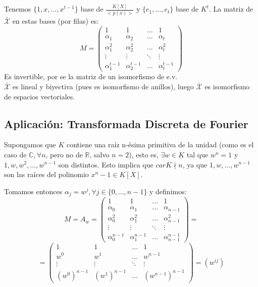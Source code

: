 \documentclass[11pt,a4paper]{article}
\theoremstyle{break}
\begin{document}
Tenemos $\{1, x, ..., x^{t-1}\}$ base de $\frac{K[X]}{<p(x)>}$ y $\{e_{1}, ..., e_{t}\}$ base de $K^{t}$. La matriz de $\bar{\mathcal{X}}$ en estas bases (por filas) es:
\begin{equation*}
M =
\begin{pmatrix}
1 & 1 & ... & 1 \\
\alpha_{1} & \alpha_{2} & ... & \alpha_{t} \\
\alpha_{1}^{2} & \alpha_{2}^{2} & ... & \alpha_{t}^{2} \\
\vdots & \vdots & \ddots & \vdots \\
\alpha_{1}^{t-1} & \alpha_{2}^{t-1} & ... & \alpha_{t}^{t-1}
\end{pmatrix}
\end{equation*}
Es invertible, por se la matriz de un isomorfismo de e.v. \\
$\bar{\mathcal{X}}$ es lineal y biyectiva (pues es isomorfismo de anillos), luego $\bar{\mathcal{X}}$ es isomorfismo de espacios vectoriales.

\subsection*{Aplicación: Transformada Discreta de Fourier}

Supongamos que $K$ contiene una raíz n-ésima primitiva de la unidad (como es el caso de $\mathbb{C}, \forall n$, pero no de $\mathbb{R}$, salvo $n=2$), esto es, $\exists w \in K$ tal que $w^{n} = 1$ y $1, w, w^{2}, ..., w^{n-1}$ son distintos. Esto implica que $car K \nmid n$, ya que $1, w, ..., w^{n-1}$ son las raíces del polinomio $x^{n} - 1 \in K[X]$.

Tomamos entonces $\alpha_{j} = w^{j}, \forall j \in \{0, ..., n-1\}$ y definimos:
\begin{equation*}
M = A_{w} = 
\begin{pmatrix}
1 & 1 & ... & 1 \\
\alpha_{0} & \alpha_{1} & ... & \alpha_{n-1} \\
\alpha_{0}^{2} & \alpha_{1}^{2} & ... & \alpha_{n-1}^{2} \\
\vdots & \vdots & \ddots & \vdots \\
\alpha_{0}^{n-1} & \alpha_{1}^{n-1} & ... & \alpha_{n-1}^{n-1}
\end{pmatrix}
=
\end{equation*}
\begin{equation*}
=
\begin{pmatrix}
1 & 1 & ... & 1 \\
w^{0} & w^{1} & ... & w^{n-1} \\
\vdots & \vdots & \ddots & \vdots \\
(w^{0})^{n-1} & (w^{1})^{n-1} & ... & (w^{n-1})^{n-1}
\end{pmatrix}
= (w^{ij})
\end{equation*}
\end{document}
